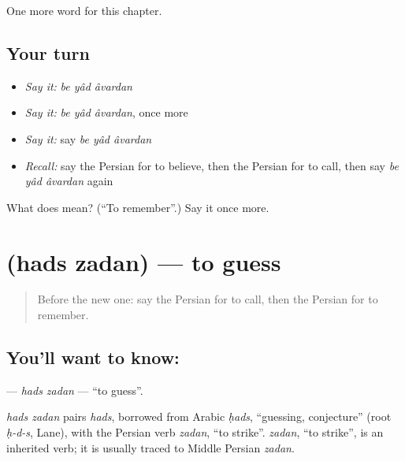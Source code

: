 \begin{grammarlens}[title={What you've built}]
One more word for this chapter.
\end{grammarlens}

\subsection*{Your turn}
\begin{itemize}
\raggedright
  \item \emph{Say it:} \emph{be yâd âvardan}
  \item \emph{Say it:} \emph{be yâd âvardan}, once more
  \item \emph{Say it:} say \emph{be yâd âvardan}
  \item \emph{Recall:} say the Persian for to believe, then the Persian for to call, then say \emph{be yâd âvardan} again
\end{itemize}

\begin{tcolorbox}[breakable,colback=teal!4,colframe=teal!35!black,title={Before you move on}]
What does    mean? (\textquotedblleft{}To remember\textquotedblright{}.) Say it once more.
\end{tcolorbox}
\section[\texorpdfstring{\fa{حدس} \fa{زدن} (hads zadan)}{حدس زدن (hads zadan)}]{  (hads zadan) — to guess}

\label{lesson:FA-C146-hads-zadan}



\begin{quote}
Before the new one: say the Persian for to call, then the Persian for to remember.
\end{quote}

\subsection*{You'll want to know:  }
\textbf{ } — \emph{hads zadan} — \textquotedblleft{}to guess\textquotedblright{}.

\begin{cousinweb}
\emph{hads zadan} pairs \emph{hads}, borrowed from Arabic \emph{ḥads}, \textquotedblleft{}guessing, conjecture\textquotedblright{} (root \emph{ḥ-d-s}, Lane), with the Persian verb \emph{zadan}, \textquotedblleft{}to strike\textquotedblright{}. \emph{zadan}, \textquotedblleft{}to strike\textquotedblright{}, is an inherited verb; it is usually traced to Middle Persian \emph{zadan}.
\end{cousinweb}


